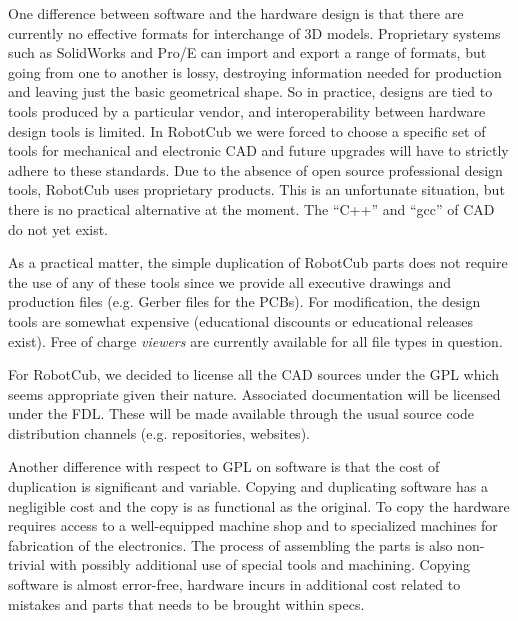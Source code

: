 One difference between software and the hardware design is that there are
currently no effective formats for interchange of 3D models.
%
Proprietary systems such as SolidWorks and Pro/E can import and export
a range of formats, but going from one to another is lossy, destroying
information needed for production and leaving just the basic geometrical
shape.
%
So in practice, designs are tied to tools produced by a particular
vendor, and interoperability
between hardware design tools is limited.
%
%
%
In RobotCub we were forced to choose a specific 
set of tools for mechanical and electronic CAD and future upgrades will have to strictly 
adhere to these standards. 
%
Due to the absence of open source professional design tools, RobotCub
uses proprietary products. 
%
This is an unfortunate situation, but there is no practical
alternative at the moment.  The ``C++'' and ``gcc'' of 
CAD do not yet exist.
%

As a practical matter, the simple duplication of RobotCub parts does not
require the use of any of these tools since we provide all executive drawings and 
production files (e.g. Gerber files for the PCBs).
%
%
%
For modification, the design tools are somewhat expensive
(educational discounts or educational releases exist).
Free of charge {\em viewers} are
currently available for all file types in question. 
%

For RobotCub, we decided to license all the CAD sources under the GPL
which seems appropriate given their nature.  Associated documentation
will be licensed under the FDL.  These will be made available through
the usual source code distribution channels (e.g. repositories,
websites).

Another difference with respect to GPL on software is that the cost
of duplication is significant and variable. Copying and duplicating 
software has a negligible cost and the copy is as functional as the 
original. To copy the hardware requires access to a well-equipped
machine shop and to specialized machines for fabrication of the 
electronics. The process of assembling the parts is also non-trivial
with possibly additional use of special tools and machining. 
Copying software is almost error-free, hardware incurs in additional 
cost related to mistakes and parts that needs to be brought within 
specs.

